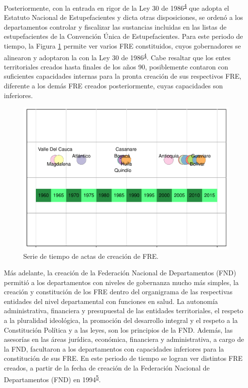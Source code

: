 \documentclass[
]{book}
\begin{document}
Posteriormente, con la entrada en rigor de la Ley 30 de 1986\textsuperscript{\protect\hyperlink{ref-CongresodelaRepublicadeColombia1986}{4}} que adopta el Estatuto Nacional de Estupefacientes y dicta otras disposiciones, se ordenó a los departamentos controlar y fiscalizar las sustancias incluidas en las listas de estupefacientes de la Convención Única de Estupefacientes. Para este periodo de tiempo, la Figura \ref{fig:serieTiempoCreacion} permite ver varios FRE constituidos, cuyos gobernadores se alinearon y adoptaron la con la Ley 30 de 1986\textsuperscript{\protect\hyperlink{ref-CongresodelaRepublicadeColombia1986}{4}}. Cabe resaltar que los entes territoriales creados hasta finales de los años 90, posiblemente contaron con suficientes capacidades internas para la pronta creación de sus respectivos FRE, diferente a los demás FRE creados posteriormente, cuyas capacidades son inferiores.

\begin{figure}[h]

{\centering \includegraphics[width=1\linewidth]{InformeFinal_files/figure-latex/serieTiempoCreacion-1} 

}

\caption{Serie de tiempo de actas de creación de FRE.}\label{fig:serieTiempoCreacion}
\end{figure}

Más adelante, la creación de la Federación Nacional de Departamentos (FND) permitió a los departamentos con niveles de gobernanza mucho más simples, la creación y constitución de los FRE dentro del organigrama de las respectivas entidades del nivel departamental con funciones en salud. La autonomía administrativa, financiera y presupuestal de las entidades territoriales, el respeto a la pluralidad ideológica, la promoción del desarrollo integral y el respeto a la Constitución Política y a las leyes, son los principios de la FND. Además, las asesorías en las áreas jurídica, económica, financiera y administrativa, a cargo de la FND, facultaron a los departamentos con capacidades inferiores para la constitución de sus FRE. En este periodo de tiempo se logran ver distintos FRE creados, a partir de la fecha de creación de la Federación Nacional de Departamentos (FND) en 1994\textsuperscript{\protect\hyperlink{ref-FederacionNacionaldeDepartamentos2021}{5}}.
\end{document}
